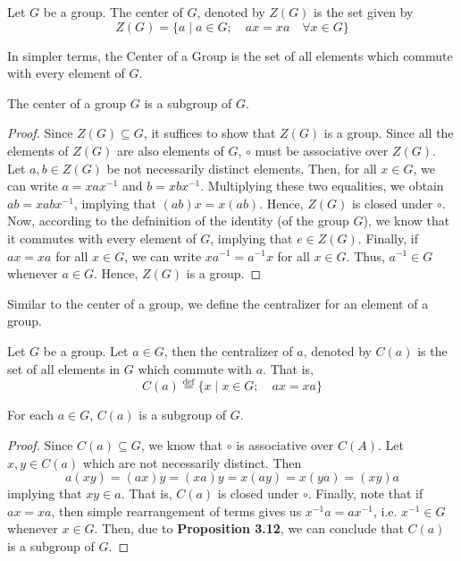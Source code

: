 \begin{definition}
	Let $G$ be a group. The center of $G$, denoted by $Z(G)$ is the set given by
	$$
	Z(G) = \{a\mid a\in G;\quad ax=xa \quad \forall x\in G\}
	$$
\end{definition}
In simpler terms, the Center of a Group is the set of all elements which commute with every element of $G$.

\begin{proposition}
	The center of a group $G$ is a subgroup of $G$.
\end{proposition}
\begin{proof}
	Since $Z(G)\subseteq G$, it suffices to show that $Z(G)$ is a group. Since all the elements of $Z(G)$ are also elements of $G$, $\circ$ must be associative over $Z(G)$. Let $a,b\in Z(G)$ be not necessarily distinct elements. Then, for all $x\in G$, we can write $a = xax^{-1}$ and $b=xbx^{-1}$. Multiplying these two equalities, we obtain $ab=xabx^{-1}$, implying that $(ab)x=x(ab)$. Hence, $Z(G)$ is closed under $\circ$. Now, according to the defninition of the identity (of the group $G$), we know that it commutes with every element of $G$, implying that $e\in Z(G)$. Finally, if $ax=xa$ for all $x\in G$, we can write $xa^{-1}=a^{-1}x$ for all $x\in G$. Thus, $a^{-1}\in G$ whenever $a\in G$. Hence, $Z(G)$ is a group.
\end{proof}

Similar to the center of a group, we define the centralizer for an element of a group.
\begin{definition}[Centralizer]
	Let $G$ be a group. Let $a\in G$, then the centralizer of $a$, denoted by $C(a)$ is the set of all elements in $G$ which commute with $a$. That is,
	$$
	C(a) \stackrel{\text{def}}{=}\{x\mid x\in G;\quad ax=xa\}
	$$
\end{definition}

\begin{proposition}
	For each $a\in G$, $C(a)$ is a subgroup of $G$.
\end{proposition}
\begin{proof}
	Since $C(a)\subseteq G$, we know that $\circ$ is associative over $C(A)$. Let $x,y\in C(a)$ which are not necessarily distinct. Then
	$$
	a(xy) = (ax)y = (xa)y = x(ay) = x(ya) = (xy)a
	$$
	implying that $xy\in a$. That is, $C(a)$ is closed under $\circ$. Finally, note that if $ax=xa$, then simple rearrangement of terms gives us $x^{-1}a = ax^{-1}$, i.e. $x^{-1}\in G$ whenever $x\in G$. Then, due to \textbf{Proposition 3.12}, we can conclude that $C(a)$ is a subgroup of $G$.
\end{proof}








